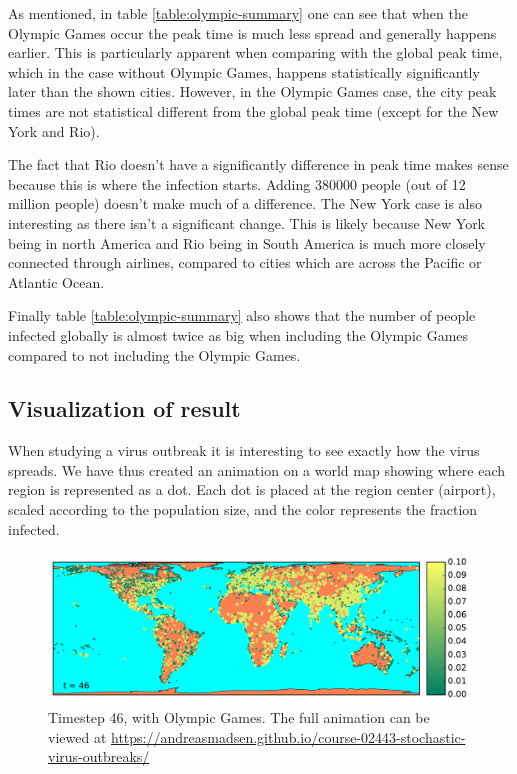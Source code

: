 As mentioned, in table \ref{table:olympic-summary} one can see that when the Olympic Games occur the peak time is much less spread and generally happens earlier. This is particularly apparent when comparing with the global peak time, which in the case without Olympic Games, happens statistically significantly later than the shown cities. However, in the Olympic Games case, the city peak times are not statistical different from the global peak time (except for the New York and Rio).

The fact that Rio doesn't have a significantly difference in peak time makes sense because this is where the infection starts. Adding 380000 people (out of 12 million people) doesn't make much of a difference. The New York case is also interesting as there isn't a significant change. This is likely because New York being in north America and Rio being in South America is much more closely connected through airlines, compared to cities which are across the Pacific or Atlantic Ocean.

Finally table \ref{table:olympic-summary} also shows that the number of people infected globally is almost twice as big when including the Olympic Games compared to not including the Olympic Games.


\subsection{Visualization of result}
When studying a virus outbreak it is interesting to see exactly how the virus spreads. We have thus created an animation on a world map showing where each region is represented as a dot. Each dot is placed at the region center (airport), scaled according to the population size, and the color represents the fraction infected.

\begin{figure}[H]
	\centering
	\includegraphics[width=1.0 \linewidth]{plots/gifs/frames/rio-46}
	\caption{Timestep 46, with Olympic Games. The full animation can be viewed at
		\url{https://andreasmadsen.github.io/course-02443-stochastic-virus-outbreaks/}}
	\label{fig:rio-46}
\end{figure}

